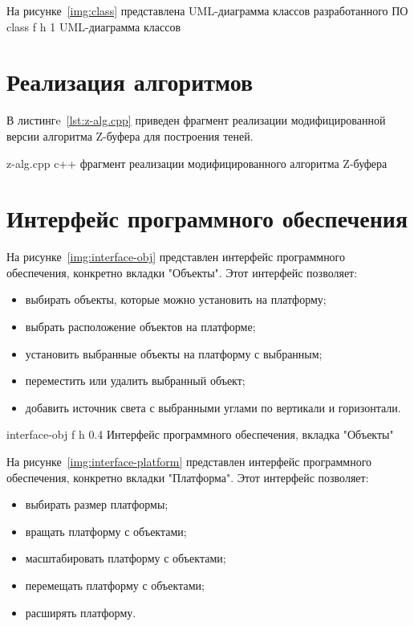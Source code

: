 На рисунке~\ref{img:class} представлена UML-диаграмма классов разработанного ПО
\clearpage
{}
{class} %
{f} %
{h} %
{1\textwidth} %
{UML-диаграмма классов} %
\clearpage


\section{Реализация алгоритмов}

В листингe~\ref{lst:z-alg.cpp} приведен фрагмент реализации модифицированной версии алгоритма Z-буфера для построения теней.
	
{z-alg.cpp} %
{c++} %
{фрагмент реализации модифицированного алгоритма Z-буфера} %

\section{Интерфейс программного обеспечения}

На рисунке~\ref{img:interface-obj} представлен интерфейс программного обеспечения, конкретно вкладки "Объекты". Этот интерфейс позволяет:
\begin{itemize}
	\item выбирать объекты, которые можно установить на платформу;
	\item выбрать расположение объектов на платформе;
	\item установить выбранные объекты на платформу с выбранным;
	\item переместить или удалить выбранный объект;
	\item добавить источник света с выбранными углами по вертикали и горизонтали.
\end{itemize}

	{interface-obj} %
	{f} %
	{h} %
	{0.4\textwidth} %
	{Интерфейс программного обеспечения, вкладка "Объекты"} %


На рисунке~\ref{img:interface-platform} представлен интерфейс программного обеспечения, конкретно вкладки "Платформа". Этот интерфейс позволяет:
\begin{itemize}
	\item выбирать размер платформы;
	\item вращать платформу с объектами;
	\item масштабировать платформу с объектами;
	\item перемещать платформу с объектами;
	\item расширять платформу.
\end{itemize}

